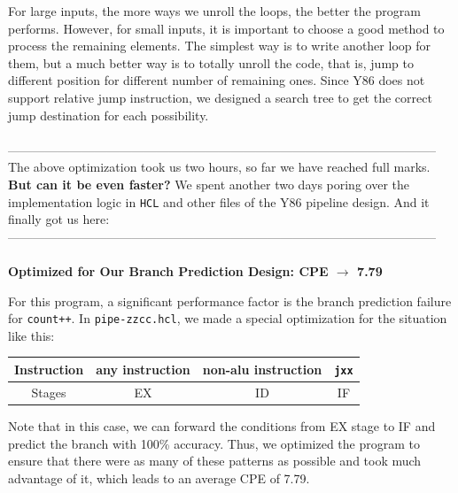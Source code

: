 \documentclass[12pt,a4paper]{article}
\begin{document}
For large inputs, the more ways we unroll the loops, the better the program performs. However, for 
small inputs, it is important to choose a good method to process the remaining elements. The simplest 
way is to write another loop for them, but a much better way is to totally unroll the code, that is, 
jump to different position for different number of remaining ones. Since Y86 does not support relative 
jump instruction, we designed a search tree to get the correct jump destination for each possibility.
\\
\\
--------------------------------------------------------------------------------------------------------\\
The above optimization took us two hours, so far we have reached full marks.\\
\textbf{But can it be even faster?}
We spent another two days poring over the implementation logic in \texttt{HCL} and other files of the Y86 pipeline design. And it finally got us here:\\
--------------------------------------------------------------------------------------------------------\\
\\
{\color{red}\textbf{Optimized for Our Branch Prediction Design: CPE $\rightarrow$ 7.79}} 

For this program, a significant performance factor is the branch prediction failure for \texttt{count++}.
In \texttt{pipe-zzcc.hcl}, we made a special optimization for the situation like this:
\begin{center}

\begin{tabular}{|c|c|c|c|}
        \hline Instruction&any instruction&non-alu instruction&\texttt{jxx}\\
        \hline Stages&EX&ID&IF\\
        \hline
\end{tabular}
\end{center}

Note that in this case, we can forward the conditions from EX stage to IF and predict the branch with 100\% accuracy. 
Thus, we optimized the program to ensure that there were as many of these patterns as 
possible and took much advantage of it, which leads to an average CPE of 7.79.
\end{document}
